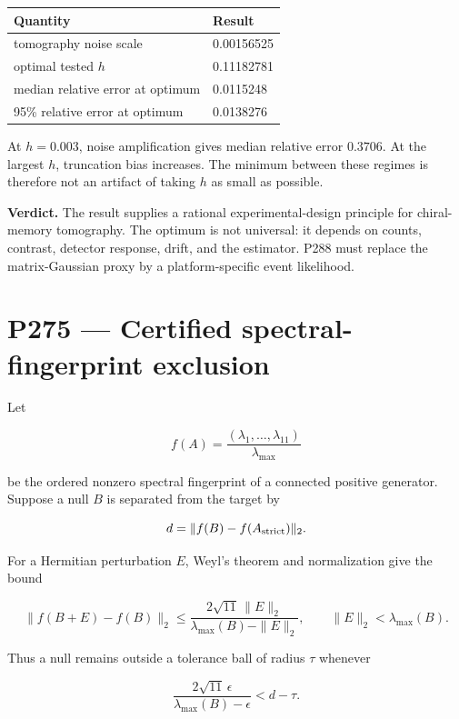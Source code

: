 \documentclass[11pt,a4paper,openany]{report}
\begin{document}
\begin{center}
\begingroup\small
\setlength{\tabcolsep}{2.5pt}
\renewcommand{\arraystretch}{1.16}
\begin{longtable}{@{}p{}p{}@{}}
\toprule
\textbf{Quantity} & \textbf{Result} \\
\midrule
\endhead
tomography noise scale & 0.00156525 \\
optimal tested \(h\) & 0.11182781 \\
median relative error at optimum & 0.0115248 \\
95\% relative error at optimum & 0.0138276 \\
\bottomrule
\end{longtable}
\endgroup
\end{center}

At \(h=0.003\), noise amplification gives median relative error \(0.3706\). At the largest \(h\), truncation bias increases. The minimum between these regimes is therefore not an artifact of taking \(h\) as small as possible.

\textbf{Verdict.} The result supplies a rational experimental-design principle for chiral-memory tomography. The optimum is not universal: it depends on counts, contrast, detector response, drift, and the estimator. P288 must replace the matrix-Gaussian proxy by a platform-specific event likelihood.

\chapter{P275 --- Certified spectral-fingerprint exclusion}

Let

\[
f(A)
=
\frac{(\lambda_1,\ldots,\lambda_{11})}
{\lambda_{\max}}
\]

be the ordered nonzero spectral fingerprint of a connected positive generator. Suppose a null \(B\) is separated from the target by

\[
d=\|f(B)-f(A_{\rm strict})\|_2.
\]

For a Hermitian perturbation \(E\), Weyl's theorem and normalization give the bound

\[
\|f(B+E)-f(B)\|_2
\le
\frac{2\sqrt{11}\,\|E\|_2}
{\lambda_{\max}(B)-\|E\|_2},
\qquad
\|E\|_2<\lambda_{\max}(B).
\]

Thus a null remains outside a tolerance ball of radius \(\tau\) whenever

\[
\frac{2\sqrt{11}\,\epsilon}
{\lambda_{\max}(B)-\epsilon}
<
d-\tau.
\]
\end{document}
